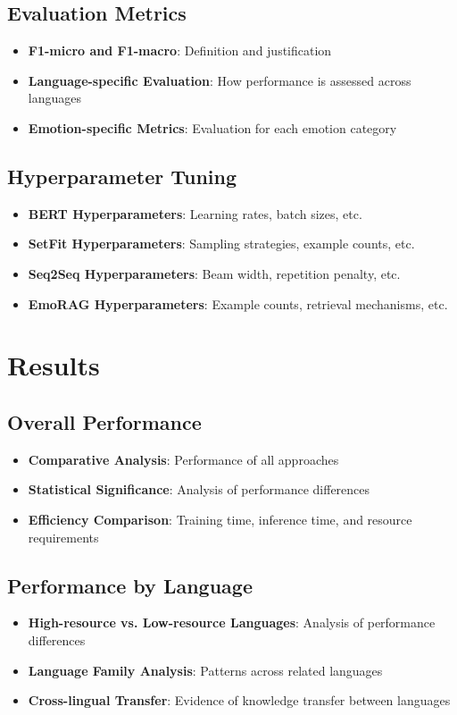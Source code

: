 \documentclass[a4paper,12pt]{extarticle}
\begin{document}
\subsection{Evaluation Metrics}
\begin{itemize}
\item \textbf{F1-micro and F1-macro}: Definition and justification
\item \textbf{Language-specific Evaluation}: How performance is assessed across languages
\item \textbf{Emotion-specific Metrics}: Evaluation for each emotion category
\end{itemize}

\subsection{Hyperparameter Tuning}
\begin{itemize}
\item \textbf{BERT Hyperparameters}: Learning rates, batch sizes, etc.
\item \textbf{SetFit Hyperparameters}: Sampling strategies, example counts, etc.
\item \textbf{Seq2Seq Hyperparameters}: Beam width, repetition penalty, etc.
\item \textbf{EmoRAG Hyperparameters}: Example counts, retrieval mechanisms, etc.
\end{itemize}

\section{Results}

\subsection{Overall Performance}
\begin{itemize}
\item \textbf{Comparative Analysis}: Performance of all approaches
\item \textbf{Statistical Significance}: Analysis of performance differences
\item \textbf{Efficiency Comparison}: Training time, inference time, and resource requirements
\end{itemize}

\subsection{Performance by Language}
\begin{itemize}
\item \textbf{High-resource vs. Low-resource Languages}: Analysis of performance differences
\item \textbf{Language Family Analysis}: Patterns across related languages
\item \textbf{Cross-lingual Transfer}: Evidence of knowledge transfer between languages
\end{itemize}
\end{document}
